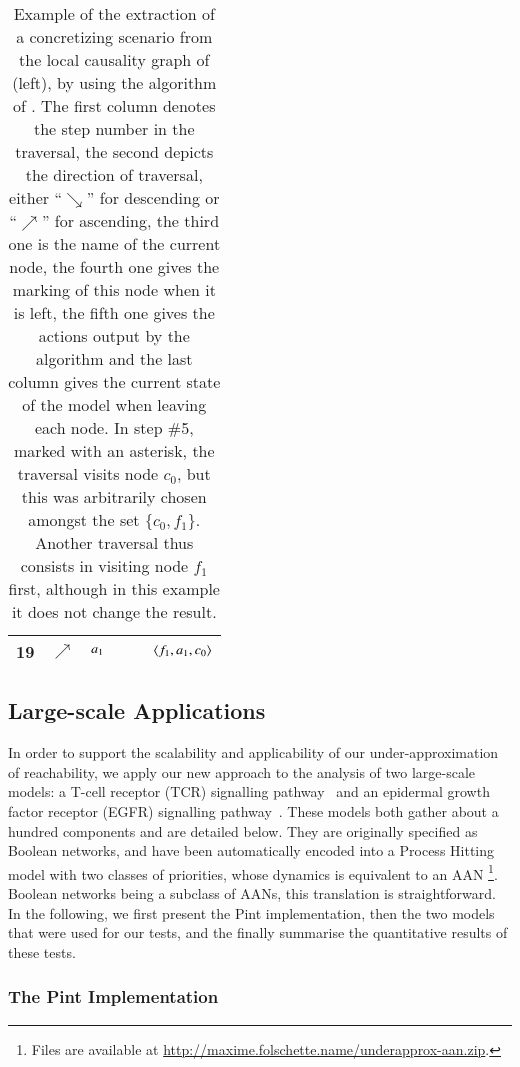 \begin{table}[p]
\begin{tabular}{|c|c|c|l|l|l|}
    19 & $\nearrow$ & $a_1$ &  &  & $\mbox{$\langle f_1, a_1, c_0 \rangle$}$ \\\hline
  \end{tabular}
  \caption{\label{tab:concret-metazoan}%
    Example of the extraction of a concretizing scenario
    from the local causality graph of (left),
    by using the algorithm of .
    The first column denotes the step number in the traversal,
    the second depicts the direction of traversal,
    either “$\searrow$” for descending or “$\nearrow$” for ascending,
    the third one is the name of the current node,
    the fourth one gives the marking of this node when it is left,
    the fifth one gives the actions output by the algorithm
    and the last column gives the current state of the model when leaving each node.
    In step \#5, marked with an asterisk,
    the traversal visits node $c_0$, but this was arbitrarily chosen
    amongst the set $\{ c_0, f_1 \}$.
    Another traversal thus consists in visiting node $f_1$ first,
    although in this example it does not change the result.
  }
\end{table}



\subsection{Large-scale Applications}
\label{ssec:ex-tcrsig}

In order to support the scalability and applicability of our under-approximation of reachability, we
apply our new approach to the analysis of two large-scale models:
a T-cell receptor (TCR) signalling pathway~\cite{tcrsig94}
and an epidermal growth factor receptor (EGFR) signalling pathway~\cite{Samaga2009}.
These models both gather about a hundred components and are detailed below.
They are originally specified as Boolean networks,
and have been automatically encoded into
a Process Hitting model with two classes of priorities,
whose dynamics is equivalent to an AAN%
\footnote{Files are available at
\url{http://maxime.folschette.name/underapprox-aan.zip}.}.
Boolean networks being a subclass of AANs, this translation is straightforward.
In the following, we first present the Pint implementation,
then the two models that were used for our tests,
and the finally summarise the quantitative results of these tests.

\subsubsection*{The Pint Implementation}

